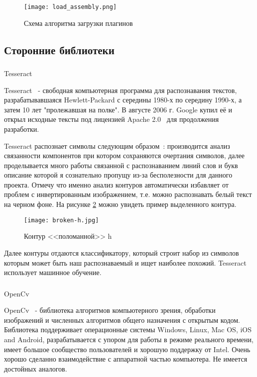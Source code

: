 \begin{figure}[p] 
    \centering
    \texttt{[image: load\_assembly.png]}  
    \caption{Схема алгоритма загрузки плагинов}
    \label{fig:creation:load_assemly}
\end{figure}

\subsection{Сторонние библиотеки}
\subsubsection{}
\label{sub:creation:tesseract}
Tesseract 

Tesseract~\cite{teseract} - свободная компьютерная программа для распознавания текстов, разрабатывавшаяся Hewlett-Packard с середины 1980-х по середину 1990-х, а затем 10 лет "пролежавшая на полке". В августе 2006 г. Google купил её и открыл исходные тексты под лицензией Apache 2.0~\cite{apache20} для продолжения разработки. 

Tesseract распознает символы следующим образом~\cite{tesseract_owerview}: производится анализ связанности компонентов при котором сохраняются очертания символов, далее проделывается много работы связанной с распознаванием линий слов и букв описание которой я сознательно пропущу из-за бесполезности для данного проекта. Отмечу что именно анализ контуров автоматически избавляет от проблем с инвертированным изображением, т.е. можно распознавать белый текст на черном фоне. На рисунке \ref{fig:domain:recognition:tesseract:hcountor} можно увидеть пример выделенного контура.
\begin{figure}[ht] 
    \centering
    \texttt{[image: broken-h.jpg]}  
    \caption{Контур <<поломанной>> h}
    \label{fig:domain:recognition:tesseract:hcountor}
\end{figure}

Далее контуры отдаются классификатору, который строит набор из символов которым может быть наш распознаваемый и ищет наиболее похожий. Tesseract использует машинное обучение.

\subsubsection{}
OpenCv

OpenCv~\cite{open_cv_en} - библиотека алгоритмов компьютерного зрения, обработки изображений и численных алгоритмов общего назначения с открытым кодом. Библиотека поддерживает операционные системы Windows, Linux, Mac OS, iOS and Android, разрабатывается с упором для работы в режиме реального времени, имеет большое сообщество пользователей и хорошую поддержку от Intel. Очень хорошо сделанно взаимодействие с аппаратной частью компьютера. Не имеется достойных аналогов.

